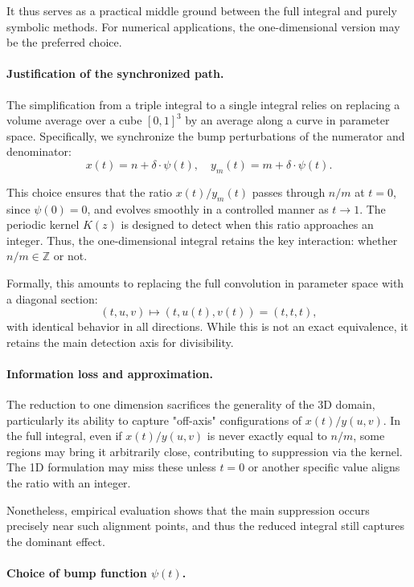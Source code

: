 \documentclass[12pt]{article}
\theoremstyle{definition}
\theoremstyle{plain}
\theoremstyle{remark}
\begin{document}
It thus serves as a practical middle ground between the full integral and purely symbolic methods. For numerical applications, the one-dimensional version may be the preferred choice.

\paragraph{Justification of the synchronized path.}

The simplification from a triple integral to a single integral relies on replacing a volume average over a cube \( [0,1]^3 \) by an average along a curve in parameter space. Specifically, we synchronize the bump perturbations of the numerator and denominator:
\[
x(t) = n + \delta \cdot \psi(t), \quad y_m(t) = m + \delta \cdot \psi(t).
\]

This choice ensures that the ratio \( x(t)/y_m(t) \) passes through \( n/m \) at \( t = 0 \), since \( \psi(0) = 0 \), and evolves smoothly in a controlled manner as \( t \to 1 \). The periodic kernel \( K(z) \) is designed to detect when this ratio approaches an integer. Thus, the one-dimensional integral retains the key interaction: whether \( n/m \in \mathbb{Z} \) or not.

Formally, this amounts to replacing the full convolution in parameter space with a diagonal section:
\[
(t, u, v) \mapsto (t, u(t), v(t)) = (t, t, t),
\]
with identical behavior in all directions. While this is not an exact equivalence, it retains the main detection axis for divisibility.

\paragraph{Information loss and approximation.}

The reduction to one dimension sacrifices the generality of the 3D domain, particularly its ability to capture "off-axis" configurations of \( x(t)/y(u,v) \). In the full integral, even if \( x(t)/y(u,v) \) is never exactly equal to \( n/m \), some regions may bring it arbitrarily close, contributing to suppression via the kernel. The 1D formulation may miss these unless \( t = 0 \) or another specific value aligns the ratio with an integer.

Nonetheless, empirical evaluation shows that the main suppression occurs precisely near such alignment points, and thus the reduced integral still captures the dominant effect.

\paragraph{Choice of bump function \( \psi(t) \).}
\end{document}
